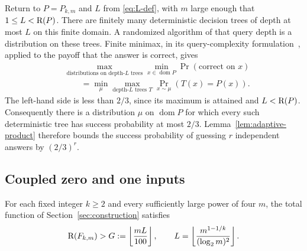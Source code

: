 Return to $P=P_{k,m}$ and $L$ from \eqref{eq:L-def}, with $m$ large
enough that $1\leq L<\mathrm R(P)$.  There are finitely many deterministic
decision trees of depth at most $L$ on this finite domain.  A randomized
algorithm of that query depth is a distribution on these trees. Finite
minimax, in its query-complexity formulation~\cite{Yao77}, applied to the
payoff that the answer is correct, gives
\[
 \begin{aligned}
 &\max_{\text{distributions on depth-$L$ trees}}
       \min_{x\in\operatorname{dom}P}\Pr(\text{correct on }x)\\
 &\hspace{2em}=
 \min_{\mu}\max_{\text{depth-$L$ trees }T}
       \Pr_{x\sim\mu}(T(x)=P(x)).
 \end{aligned}
\]
The left-hand side is less than $2/3$, since its maximum is attained
and $L<\mathrm R(P)$.  Consequently there is a distribution $\mu$ on
$\operatorname{dom}P$ for which every such deterministic tree has
success probability at most $2/3$.  Lemma~\ref{lem:adaptive-product}
therefore bounds the success probability of guessing $r$ independent
answers by $(2/3)^r$.

\subsection{Coupled zero and one inputs}

\begin{proposition}\label{prop:classical}
For each fixed integer $k\geq2$ and every sufficiently large power of
four $m$, the total function of Section~\ref{sec:construction} satisfies
\begin{equation}\label{eq:classical-lower}
 \mathrm R(F_{k,m})>
 G:=\left\lfloor\frac{mL}{100}\right\rfloor,
 \qquad
 L=\left\lfloor\frac{m^{1-1/k}}{(\log_2m)^2}\right\rfloor.
\end{equation}
\end{proposition}

